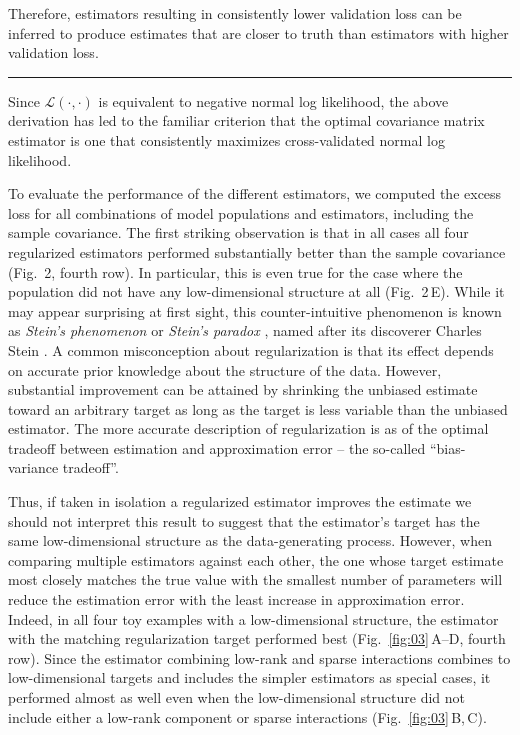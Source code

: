 \documentclass[10pt]{article}
\newcommand{\loss}[1]{\mathcal L\left(#1\right)}
\begin{document}
Therefore, estimators resulting in consistently lower validation loss can be inferred to produce estimates that are closer to truth than estimators with higher validation loss. 

\noindent\rule{8cm}{4pt}

Since $\loss{\cdot,\cdot}$ is equivalent to negative normal log likelihood, the above derivation has led to the familiar criterion that the optimal covariance matrix estimator is one that consistently maximizes cross-validated normal log likelihood.

To evaluate the performance of the different estimators, we computed the excess loss for all combinations of model populations and estimators, including the sample covariance. The first striking observation is that in all cases all four regularized estimators performed substantially better than the sample covariance (Fig.~2, fourth row). In particular, this is even true for the case where the population did not have any low-dimensional structure at all (Fig.~2\,E). While it may appear surprising at first sight, this counter-intuitive phenomenon is known as \emph{Stein's phenomenon} or \emph{Stein's paradox} \cite{Efron:1977}, named after its discoverer Charles Stein \cite{Stein:1956}. A common misconception about regularization is that its effect depends on accurate prior knowledge about the structure of the data. However, substantial improvement can be attained by shrinking the unbiased estimate toward an arbitrary target as long as the target is less variable than the unbiased estimator. The more accurate description of regularization is as of the optimal tradeoff between estimation and approximation error -- the so-called ``bias-variance tradeoff''.

Thus, if taken in isolation a regularized estimator improves the estimate we should not interpret this result to suggest that the estimator's target has the same low-dimensional structure as the data-generating process. However, when comparing multiple estimators against each other, the one whose target estimate most closely matches the true value with the smallest number of parameters will reduce the estimation error with the least increase in approximation error. Indeed, in all four toy examples with a low-dimensional structure, the estimator with the matching regularization target performed best (Fig.~\ref{fig:03}\,A--D, fourth row). 
Since the estimator combining low-rank and sparse interactions combines to low-dimensional targets and includes the simpler estimators as special cases, it performed almost as well even when the low-dimensional structure did not include either a low-rank component or sparse interactions (Fig.~\ref{fig:03}\,B,\,C). 
\end{document}
